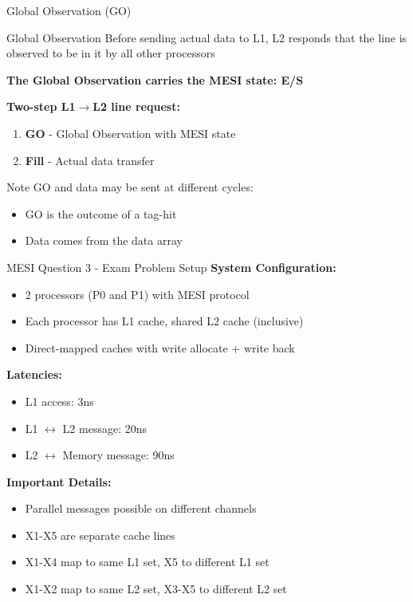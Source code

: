 \documentclass[aspectratio=169,12pt]{beamer}
\begin{document}
\begin{frame}{Global Observation (GO)}
\begin{block}{Global Observation}
Before sending actual data to L1, L2 responds that the line is observed to be in it by all other processors
\end{block}

\textbf{The Global Observation carries the MESI state: E/S}

\vspace{1em}
\textbf{Two-step L1$\rightarrow$L2 line request:}
\begin{enumerate}
\item \textbf{GO} - Global Observation with MESI state
\item \textbf{Fill} - Actual data transfer
\end{enumerate}

\vspace{1em}
\begin{alertblock}{Note}
GO and data may be sent at different cycles:
\begin{itemize}
\item GO is the outcome of a tag-hit
\item Data comes from the data array
\end{itemize}
\end{alertblock}
\end{frame}

\begin{frame}{MESI Question 3 - Exam Problem Setup}
\footnotesize
\textbf{System Configuration:}
\begin{itemize}
\item 2 processors (P0 and P1) with MESI protocol
\item Each processor has L1 cache, shared L2 cache (inclusive)
\item Direct-mapped caches with write allocate + write back
\end{itemize}

\textbf{Latencies:}
\begin{itemize}
\item L1 access: 3ns
\item L1 $\leftrightarrow$ L2 message: 20ns
\item L2 $\leftrightarrow$ Memory message: 90ns
\end{itemize}

\textbf{Important Details:}
\begin{itemize}
\item Parallel messages possible on different channels
\item X1-X5 are separate cache lines
\item X1-X4 map to same L1 set, X5 to different L1 set
\item X1-X2 map to same L2 set, X3-X5 to different L2 set
\end{itemize}
\end{frame}
\end{document}
